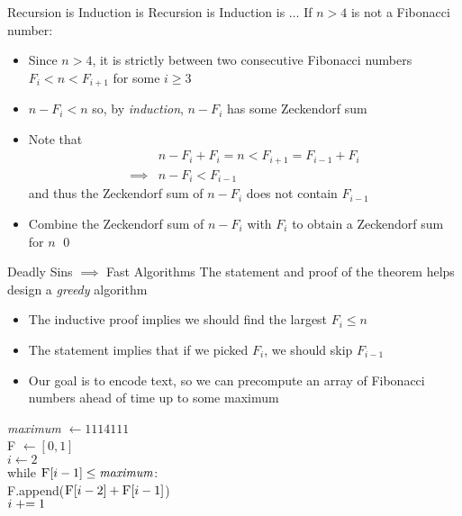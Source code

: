 \documentclass[aspectratio=169]{beamer}
\begin{document}
\begin{frame}{Recursion is Induction is Recursion is Induction is $\ldots$}
    If $n > 4$ is not a Fibonacci number:
    \begin{itemize}
        \item Since $n > 4$, it is strictly between two consecutive Fibonacci numbers $F_i < n < F_{i + 1}$ for some $i \geq 3$ \pause
        \item $n - F_i < n$ so, by \emph{induction}, $n - F_i$ has some Zeckendorf sum \pause
        \item Note that
        \begin{align*}
                    & n - F_i + F_i = n < F_{i + 1} = F_{i - 1} + F_i \\
           \implies & n - F_i < F_{i - 1}
        \end{align*} 
        and thus the Zeckendorf sum of $n - F_i$ does not contain $F_{i - 1}$ \pause
        \item Combine the Zeckendorf sum of $n - F_i$ with $F_i$ to obtain a Zeckendorf sum for $n$ \qed
    \end{itemize}
\end{frame}

\begin{frame}{Deadly Sins $\implies$ Fast Algorithms}
    The statement and proof of the theorem helps design a \emph{greedy} algorithm \pause
    \begin{itemize}
        \item The inductive proof implies we should find the largest $F_i \leq n$ \pause
        \item The statement implies that if we picked $F_i$, we should skip $F_{i - 1}$ \pause
        \item Our goal is to encode text, so we can precompute an array of Fibonacci numbers ahead of time up to some maximum
    \end{itemize}
    \begin{nalgo}
      \label{}  \textit{maximum} $\gets 1114111$ 
    \\\label{}  \textsc{F} $\gets [0, 1]$
    \\\label{}  $i \gets 2$
    \\\label{}  while $\textsc{F}[i - 1] \leq \textit{maximum}$:\+
    \\\label{}      \textsc{F}.append($\textsc{F}[i - 2] + \textsc{F}[i - 1]$)
    \\\label{}      $i \mathrel{+}= 1$
    \end{nalgo}
\end{frame}
\end{document}
